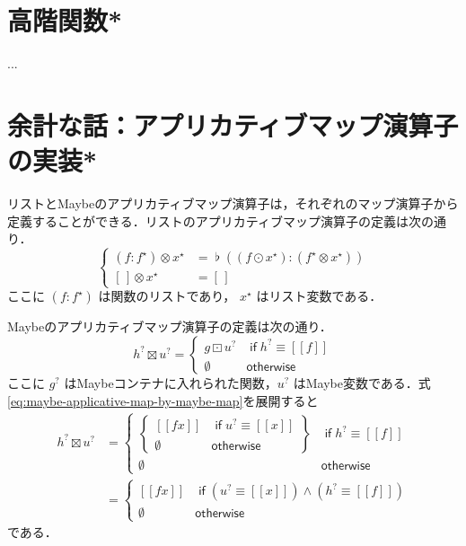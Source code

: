 \documentclass[a4paper,twocolumn]{jsbook}
\def\[{\left[\!\left[}
\def\]{\right]\!\right]}
\newcommand{\mKeyword}[1]{\mathsf{#1}} %
\newcommand{\mIfKeyword}{\mKeyword{if}}
\newcommand{\mOtherwiseKeyword}{\mKeyword{otherwise}}
\DeclareMathOperator{\mIf}{\mIfKeyword}
\DeclareMathOperator{\mOtherwise}{\mOtherwiseKeyword}
\newcommand{\mEmptyList}{{[\,]}}
\newcommand{\mNothing}{\emptyset}
\DeclareMathOperator{\mAppMapList}{\otimes}
\DeclareMathOperator{\mAppMapMaybe}{\boxtimes}
\DeclareMathOperator{\mConcat}{\flat}
\DeclareMathOperator{\mLogicalAnd}{\wedge}
\DeclareMathOperator{\mMapList}{\odot}
\DeclareMathOperator{\mMapMaybe}{\boxdot}
\newcommand{\mMaybeWith}[1]{\[#1\]}
\newcommand{\mList}[1]{{#1}^\mathrm{\star}}
\newcommand{\mMaybe}[1]{{#1}^\text{?}}
\begin{document}
\section{高階関数*}
...

\section{余計な話：アプリカティブマップ演算子の実装*}

リストとMaybeのアプリカティブマップ演算子は，それぞれのマップ演算子から定義することができる．リストのアプリカティブマップ演算子の定義は次の通り．
\begin{equation}
\left\{
\begin{split}
(f:\mList{f})\mAppMapList\mList{x}&=\mConcat{}((f\mMapList\mList{x}):(\mList{f}\mAppMapList\mList{x}))\\
\mEmptyList\mAppMapList\mList{x}&=\mEmptyList
\end{split}
\right.
\end{equation}
ここに $(f:\mList{f})$ は関数のリストであり， $\mList{x}$ はリスト変数である．

Maybeのアプリカティブマップ演算子の定義は次の通り．
\begin{equation}
\label{eq:maybe-applicative-map-by-maybe-map}
\mMaybe{h}\mAppMapMaybe\mMaybe{u}
=\begin{cases}
g\mMapMaybe\mMaybe{u}&\mIf\mMaybe{h}\equiv\mMaybeWith{f}\\
\mNothing&\mOtherwise
\end{cases}
\end{equation}
ここに $\mMaybe{g}$ はMaybeコンテナに入れられた関数，$\mMaybe{u}$ はMaybe変数である．式\eqref{eq:maybe-applicative-map-by-maybe-map}を展開すると
\begin{align}
\mMaybe{h}\mAppMapMaybe\mMaybe{u}
&=\begin{cases}
\left\{
\begin{array}{ll}
\mMaybeWith{fx}&\mIf\mMaybe{u}\equiv\mMaybeWith{x}\\
\mNothing&\mOtherwise
\end{array}\right\}
&\mIf\mMaybe{h}\equiv\mMaybeWith{f}\\
\mNothing&\mOtherwise
\end{cases}\\
&=\begin{cases}
\mMaybeWith{fx}&\mIf\left(\mMaybe{u}\equiv\mMaybeWith{x}\right)\mLogicalAnd\left(\mMaybe{h}\equiv\mMaybeWith{f}\right)\\
\mNothing&\mOtherwise
\end{cases}
\end{align}
である．
\end{document}
